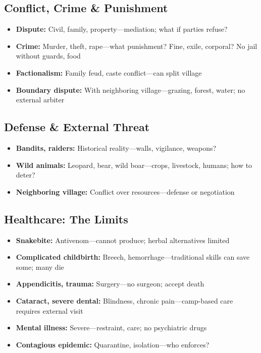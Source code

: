 \documentclass[11pt,a4paper]{article}
\begin{document}
\subsection{Conflict, Crime \& Punishment}
\begin{itemize}
    \item \textbf{Dispute:} Civil, family, property---mediation; what if parties refuse?
    \item \textbf{Crime:} Murder, theft, rape---what punishment? Fine, exile, corporal? No jail without guards, food
    \item \textbf{Factionalism:} Family feud, caste conflict---can split village
    \item \textbf{Boundary dispute:} With neighboring village---grazing, forest, water; no external arbiter
\end{itemize}

\subsection{Defense \& External Threat}
\begin{itemize}
    \item \textbf{Bandits, raiders:} Historical reality---walls, vigilance, weapons?
    \item \textbf{Wild animals:} Leopard, bear, wild boar---crops, livestock, humans; how to deter?
    \item \textbf{Neighboring village:} Conflict over resources---defense or negotiation
\end{itemize}

\subsection{Healthcare: The Limits}
\begin{itemize}
    \item \textbf{Snakebite:} Antivenom---cannot produce; herbal alternatives limited
    \item \textbf{Complicated childbirth:} Breech, hemorrhage---traditional skills can save some; many die
    \item \textbf{Appendicitis, trauma:} Surgery---no surgeon; accept death
    \item \textbf{Cataract, severe dental:} Blindness, chronic pain---camp-based care requires external visit
    \item \textbf{Mental illness:} Severe---restraint, care; no psychiatric drugs
    \item \textbf{Contagious epidemic:} Quarantine, isolation---who enforces?
\end{itemize}
\end{document}
